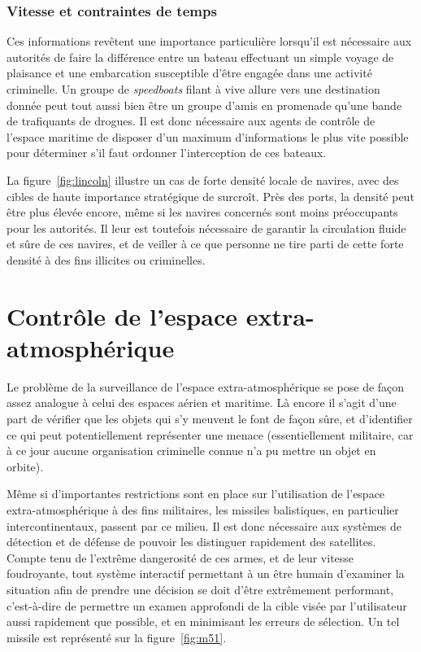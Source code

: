 	\subsubsection{Vitesse et contraintes de temps}
	Ces informations revêtent une importance particulière lorsqu'il est nécessaire aux autorités de faire la différence entre un bateau effectuant un simple voyage de plaisance et une embarcation susceptible d'être engagée dans une activité criminelle. Un groupe de \emph{speedboats} filant à vive allure vers une destination donnée peut tout aussi bien être un groupe d'amis en promenade qu'une bande de trafiquants de drogues. Il est donc nécessaire aux agents de contrôle de l'espace maritime de disposer d'un maximum d'informations le plus vite possible pour déterminer s'il faut ordonner l'interception de ces bateaux.
	
	La figure~\ref{fig:lincoln} illustre un cas de forte densité locale de navires, avec des cibles de haute importance stratégique de surcroît. Près des ports, la densité peut être plus élevée encore, même si les navires concernés sont moins préoccupants pour les autorités. Il leur est toutefois nécessaire de garantir la circulation fluide et sûre de ces navires, et de veiller à ce que personne ne tire parti de cette forte densité à des fins illicites ou criminelles.
	
	\section{Contrôle de l'espace extra-atmosphérique}
	Le problème de la surveillance de l'espace extra-atmosphérique se pose de façon assez analogue à celui des espaces aérien et maritime. Là encore il s'agit d'une part de vérifier que les objets qui s'y meuvent le font de façon sûre, et d'identifier ce qui peut potentiellement représenter une menace (essentiellement militaire, car à ce jour aucune organisation criminelle connue n'a pu mettre un objet en orbite).
	
	Même si d'importantes restrictions sont en place sur l'utilisation de l'espace extra-atmosphérique à des fins militaires\footnotemark, les missiles balistiques, en particulier intercontinentaux, passent par ce milieu. Il est donc nécessaire aux systèmes de détection et de défense de pouvoir les distinguer rapidement des satellites. Compte tenu de l'extrême dangerosité de ces armes, et de leur vitesse foudroyante, tout système interactif permettant à un être humain d'examiner la situation afin de prendre une décision se doit d'être extrêmement performant, c'est-à-dire de permettre un examen approfondi de la cible visée par l'utilisateur aussi rapidement que possible, et en minimisant les erreurs de sélection. Un tel missile est représenté sur la figure~\ref{fig:m51}.
	
